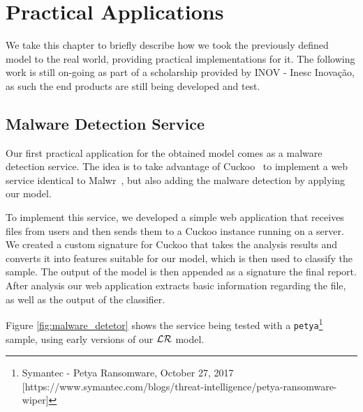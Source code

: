 
\chapter{Practical Applications}
\label{chapter:practical_applications}

We take this chapter to briefly describe how we took the previously defined model to the real world, providing practical implementations for it.
The following work is still on-going as part of a scholarship provided by INOV - Inesc Inovação, as such the end products are still being developed and test.

\section{Malware Detection Service}
\label{section:malware_service}

Our first practical application for the obtained model comes as a malware detection service.
The idea is to take advantage of Cuckoo~\cite{tool:cuckoo} to implement a web service identical to Malwr~\cite{tool:malwr}, but also adding the malware detection by applying our model.

To implement this service, we developed a simple web application that receives files from users and then sends them to a Cuckoo instance running on a server.
We created a custom signature for Cuckoo that takes the analysis results and converts it into features suitable for our model, which is then used to classify the sample.
The output of the model is then appended as a signature the final report.
After analysis our web application extracts basic information regarding the file, as well as the output of the classifier.

Figure \ref{fig:malware_detetor} shows the service being tested with a \texttt{petya}\footnote{Symantec - Petya Ransomware, October 27, 2017 [https://www.symantec.com/blogs/threat-intelligence/petya-ransomware-wiper]} sample, using early versions of our $\mathcal{LR}$ model.

